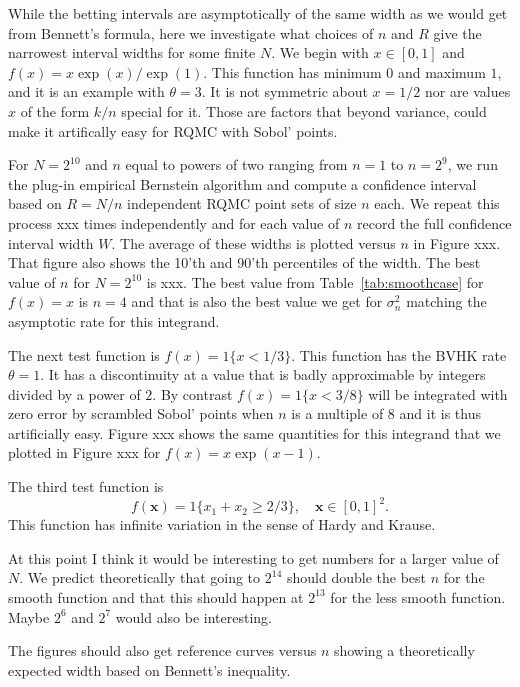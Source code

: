 \documentclass{article}
\newcommand{\art}[1]{\begingroup\color{blue}#1\endgroup}
\renewcommand{\ge}{\geqslant}
\newcommand{\bsx}{\boldsymbol{x}}
\begin{document}
While the betting intervals are asymptotically of the
same width as we would get from Bennett's formula, here
we investigate what choices of $n$ and $R$ give the
narrowest interval widths for some finite $N$. 
We begin with $x\in[0,1]$ and $f(x)=x\exp(x)/\exp(1)$.
This function has minimum $0$ and maximum $1$,  and it is an example
with $\theta=3$. It is not symmetric about $x=1/2$
nor are values $x$ of the form $k/n$ special for it.
Those are factors that beyond variance, could make it
artifically easy for RQMC with Sobol' points.

For $N=2^{10}$ and $n$ equal to powers of two ranging
from $n=1$ to $n=2^9$, we run the plug-in empirical
Bernstein algorithm and compute a confidence interval
based on $R=N/n$ independent RQMC point sets of size $n$ each.
We repeat this process \art{xxx} times independently
and for each value of $n$ record the full confidence
interval width $W$.  The average of these widths is plotted
versus $n$ in Figure xxx.  That figure also shows the
10'th and 90'th percentiles of the width.  The best value
of $n$ for $N=2^{10}$ is xxx. The best value from
Table~\ref{tab:smoothcase} for $f(x)=x$ is $n=4$
and that is also the best value we get for
$\sigma^2_n$ matching the asymptotic rate for this integrand.

The next test function is $f(x)=1\{x<1/3\}$.
This function has the BVHK rate $\theta=1$.
It has a discontinuity at a value that is badly
approximable by integers divided by a power of $2$.
By contrast $f(x) = 1\{x < 3/8\}$ will be integrated
with zero error by scrambled Sobol' points when $n$
is a multiple of $8$ and it is thus artificially easy.
Figure xxx shows the same quantities for this integrand
that we plotted in Figure xxx for $f(x)=x\exp(x-1)$.

The third test function is
$$
f(\bsx) = 1\{x_1+x_2\ge 2/3\},\quad \bsx\in[0,1]^2.
$$
This function has infinite variation in the sense
of Hardy and Krause.

\art{At this point I think it would be interesting
to get numbers for a larger value of $N$.  We predict
theoretically that going to $2^{14}$ should double
the best $n$ for the smooth function and that this
should happen at $2^{13}$ for the less smooth function.
Maybe $2^6$ and $2^7$ would also be interesting.}

\art{The figures should also get reference curves versus
$n$ showing a theoretically expected width based on Bennett's inequality.}
\end{document}
